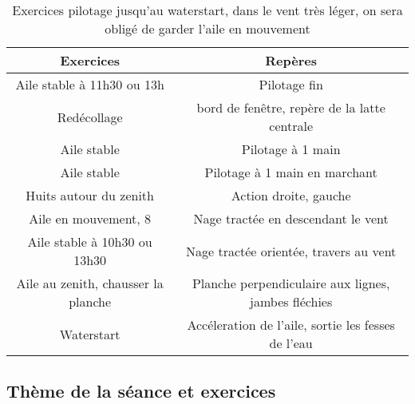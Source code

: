 \documentclass[11pt,a4paper]{report}
\begin{document}
\begin{table}
\begin{tabular}{|c|c|}
\hline
\textbf{Exercices}     &  \textbf{Repères}      \\
\hline 
Aile stable à 11h30 ou 13h & Pilotage fin  \\
\hline
Redécollage            & bord de fen\^etre, repère de la latte centrale \\
\hline
Aile stable               & Pilotage à 1 main \\
\hline 
Aile stable               & Pilotage à 1 main en marchant \\
\hline 
Huits autour du zenith & Action droite, gauche  \\
\hline
Aile en mouvement, 8      & Nage tractée en descendant le vent \\
\hline 
Aile stable à 10h30 ou 13h30   	& Nage tractée orientée, travers au vent \\
\hline
Aile au zenith, chausser la planche  & Planche perpendiculaire aux lignes, jambes fléchies \\
\hline
Waterstart                           &  Accéleration de l'aile, sortie les fesses de l'eau \\
\hline
\end{tabular}
\caption{Exercices pilotage jusqu'au waterstart, dans le vent très léger, on sera obligé de garder l'aile en mouvement\label{seance_pilotage}}
\end{table}

\subsection{Thème de la séance et exercices}


%
%
\end{document}
